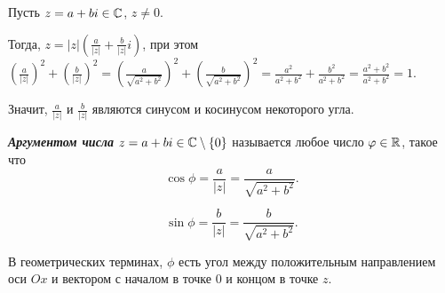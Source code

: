 Пусть $z = a + bi \in \mathbb{C}$, $z \neq 0$.

Тогда, $z = |z| \left(\frac{a}{|z|} + \frac{b}{|z|}i\right)$, при этом $\left(\frac{a}{|z|}\right)^2 + \left(\frac{b}{|z|}\right)^2 = (\frac{a}{\sqrt{a^2 + b^2}})^2 + (\frac{b}{\sqrt{a^2 + b^2}})^2 = \frac{a^2}{a^2 + b^2} + \frac{b^2}{a^2 + b^2} = \frac{a^2 + b^2}{a^2 + b^2} = 1.$

Значит, $\frac{a}{|z|}$ и $\frac{b}{|z|}$ являются синусом и косинусом некоторого угла.

\begin{definition}
    \textbf{\textit{Аргументом числа}} $z = a + bi \in \mathbb{C} \setminus \{0\}$ называется любое число $\varphi \in \mathbb{R}$, такое что
    \begin{equation*}
        \cos \phi = \frac{a}{|z|} = \frac{a} {\sqrt{a^2 + b^2}}.
    \end{equation*}

    \begin{equation*}
        \sin \phi = \frac{b}{|z|} = \frac{b}{\sqrt{a^2 + b^2}}.
    \end{equation*}

    В геометрических терминах, $\phi$ есть угол между положительным направлением оси $Ox$ и вектором с началом в точке $0$ и концом в точке $z$.
\end{definition}

